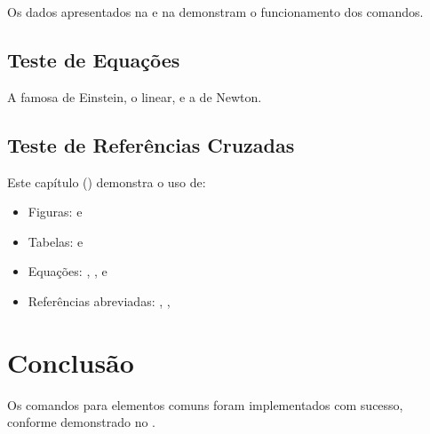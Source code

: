 \documentclass[mestrado]{UnB-PPGT}
\begin{document}
Os dados apresentados na  e na  demonstram o funcionamento dos comandos.

\section{Teste de Equações}




A famosa  de Einstein, o  linear, e a  de Newton.

\section{Teste de Referências Cruzadas}

Este capítulo () demonstra o uso de:
\begin{itemize}
\item Figuras:  e 
\item Tabelas:  e   
\item Equações: , , e 
\item Referências abreviadas: , , 
\end{itemize}

\chapter{Conclusão}\label{cap:conclusao}

Os comandos para elementos comuns foram implementados com sucesso, conforme demonstrado no .
\end{document}
